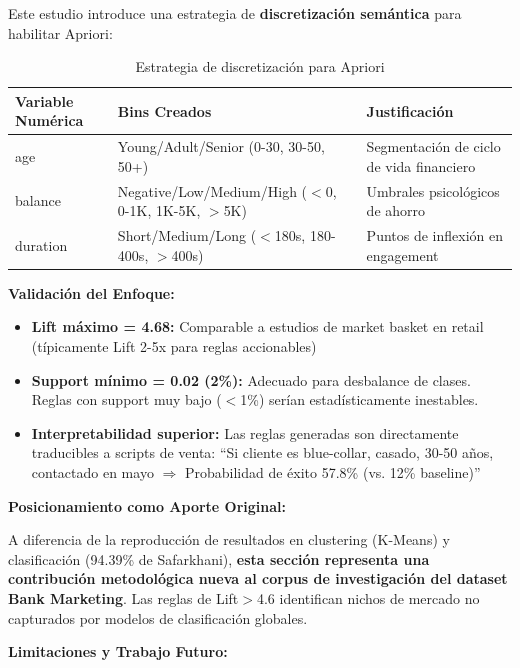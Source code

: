 \documentclass[12pt,letterpaper]{article}
\begin{document}
Este estudio introduce una estrategia de \textbf{discretización semántica} para habilitar Apriori:

\begin{table}[H]
\centering
\caption{Estrategia de discretización para Apriori}
\label{tab:discretizacion}
\small
\begin{tabular}{@{} p{3.5cm} p{5.5cm} p{6.5cm} @{}}
\toprule
\textbf{Variable Numérica} & \textbf{Bins Creados} & \textbf{Justificación} \\
\midrule
age & Young/Adult/Senior (0-30, 30-50, 50+) & Segmentación de ciclo de vida financiero \\
\addlinespace
balance & Negative/Low/Medium/High ($<$0, 0-1K, 1K-5K, $>$5K) & Umbrales psicológicos de ahorro \\
\addlinespace
duration & Short/Medium/Long ($<$180s, 180-400s, $>$400s) & Puntos de inflexión en engagement \\
\bottomrule
\end{tabular}
\end{table}

\textbf{Validación del Enfoque:}

\begin{itemize}
    \item \textbf{Lift máximo = 4.68:} Comparable a estudios de market basket en retail (típicamente Lift 2-5x para reglas accionables) \cite{agrawal1994fast}
    
    \item \textbf{Support mínimo = 0.02 (2\%):} Adecuado para desbalance de clases. Reglas con support muy bajo ($<$1\%) serían estadísticamente inestables.
    
    \item \textbf{Interpretabilidad superior:} Las reglas generadas son directamente traducibles a scripts de venta: ``Si cliente es blue-collar, casado, 30-50 años, contactado en mayo $\Rightarrow$ Probabilidad de éxito 57.8\% (vs. 12\% baseline)''
\end{itemize}

\textbf{Posicionamiento como Aporte Original:}

A diferencia de la reproducción de resultados en clustering (K-Means) y clasificación (94.39\% de Safarkhani), \textbf{esta sección representa una contribución metodológica nueva al corpus de investigación del dataset Bank Marketing}. Las reglas de Lift$>$4.6 identifican nichos de mercado no capturados por modelos de clasificación globales.

\textbf{Limitaciones y Trabajo Futuro:}
\end{document}
